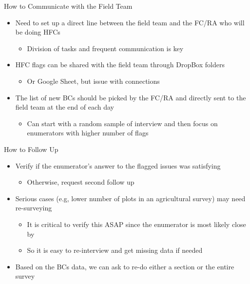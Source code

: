 \documentclass[aspectratio=169]{beamer}
\begin{document}
\begin{frame}{How to Communicate with the Field Team}
    
    \begin{itemize}
    \setlength\itemsep{2em}
        
        \vspace{1em}
        \item Need to set up a direct line between the field team and the FC/RA who will be doing HFCs
        \begin{itemize}
            \item Division of tasks and frequent communication is key
        \end{itemize}
        \item HFC flags can be shared with the field team through DropBox folders
        \begin{itemize}
            \item Or Google Sheet, but issue with connections
        \end{itemize}
        \item The list of new BCs should be picked by the FC/RA and directly sent to the field team at the end of each day
        \begin{itemize}
            \item Can start with a random sample of interview and then focus on enumerators with higher number of flags
        \end{itemize}
        
    \end{itemize}
    
\end{frame}

\begin{frame}{How to Follow Up}

\begin{itemize}
    \setlength\itemsep{1.5em}
    \item Verify if the enumerator's answer to the flagged issues was satisfying
        \begin{itemize}
            \item Otherwise, request second follow up
        \end{itemize}
    
    \item Serious cases (e.g, lower number of plots in an agricultural survey) may need re-surveying
        \begin{itemize}
            \item It is critical to verify this ASAP since the enumerator is most likely close by
            \item So it is easy to re-interview and get missing data if needed
        \end{itemize}
        
    \item Based on the BCs data, we can ask to re-do either a section or the entire survey
    
\end{itemize}

\end{frame}
\end{document}
